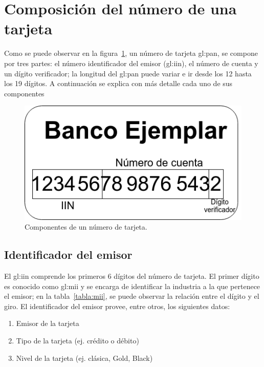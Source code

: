 %
%

\section{Composición del número de una tarjeta}
Como se puede observar en la figura~\ref{figura:pan}, un número de tarjeta
\gls{gl:pan}, se compone por tres partes: el número identificador del emisor
(\gls{gl:iin}), el número de cuenta y un dígito verificador; la longitud del
\gls{gl:pan} puede variar e ir desde los 12 hasta los 19 dígitos. A
continuación se explica con más detalle cada uno de sus componentes

\begin{figure}[H]
  \begin{center}
    \includegraphics[width=0.4\linewidth]{diagramas/tarjeta}
    \caption{Componentes de un número de tarjeta.}\label{figura:pan}
   \end{center}
\end{figure}

\subsection{Identificador del emisor}
El \gls{gl:iin} comprende los primeros 6 dígitos del número de
tarjeta. El primer dígito es conocido como \gls{gl:mii} y se encarga de
identificar la industria a la que pertenece el emisor; en la
tabla~\ref{tabla:mii}, se puede observar la relación entre el dígito y el giro.
El identificador del emisor provee, entre otros, los siguientes datos:
\begin{enumerate}
    \item Emisor de la tarjeta
    \item Tipo de la tarjeta (ej. crédito o débito)
    \item Nivel de la tarjeta (ej. clásica, Gold, Black)
\end{enumerate}

